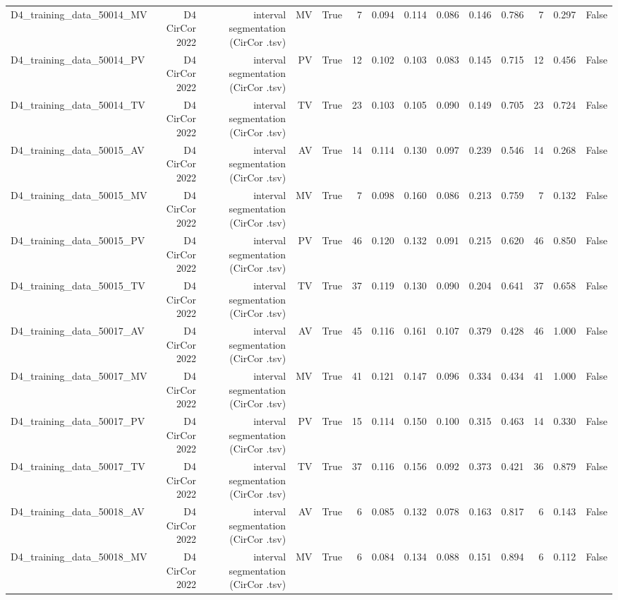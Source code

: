 \begin{table}[htbp]
\begin{tabular}{lrrrrrrrrrrrrr}
    D4\_training\_data\_50014\_MV & D4 CirCor 2022 & interval segmentation (CirCor .tsv) & MV & True & 7 & 0.094 & 0.114 & 0.086 & 0.146 & 0.786 & 7 & 0.297 & False \\
    D4\_training\_data\_50014\_PV & D4 CirCor 2022 & interval segmentation (CirCor .tsv) & PV & True & 12 & 0.102 & 0.103 & 0.083 & 0.145 & 0.715 & 12 & 0.456 & False \\
    D4\_training\_data\_50014\_TV & D4 CirCor 2022 & interval segmentation (CirCor .tsv) & TV & True & 23 & 0.103 & 0.105 & 0.090 & 0.149 & 0.705 & 23 & 0.724 & False \\
    D4\_training\_data\_50015\_AV & D4 CirCor 2022 & interval segmentation (CirCor .tsv) & AV & True & 14 & 0.114 & 0.130 & 0.097 & 0.239 & 0.546 & 14 & 0.268 & False \\
    D4\_training\_data\_50015\_MV & D4 CirCor 2022 & interval segmentation (CirCor .tsv) & MV & True & 7 & 0.098 & 0.160 & 0.086 & 0.213 & 0.759 & 7 & 0.132 & False \\
    D4\_training\_data\_50015\_PV & D4 CirCor 2022 & interval segmentation (CirCor .tsv) & PV & True & 46 & 0.120 & 0.132 & 0.091 & 0.215 & 0.620 & 46 & 0.850 & False \\
    D4\_training\_data\_50015\_TV & D4 CirCor 2022 & interval segmentation (CirCor .tsv) & TV & True & 37 & 0.119 & 0.130 & 0.090 & 0.204 & 0.641 & 37 & 0.658 & False \\
    D4\_training\_data\_50017\_AV & D4 CirCor 2022 & interval segmentation (CirCor .tsv) & AV & True & 45 & 0.116 & 0.161 & 0.107 & 0.379 & 0.428 & 46 & 1.000 & False \\
    D4\_training\_data\_50017\_MV & D4 CirCor 2022 & interval segmentation (CirCor .tsv) & MV & True & 41 & 0.121 & 0.147 & 0.096 & 0.334 & 0.434 & 41 & 1.000 & False \\
    D4\_training\_data\_50017\_PV & D4 CirCor 2022 & interval segmentation (CirCor .tsv) & PV & True & 15 & 0.114 & 0.150 & 0.100 & 0.315 & 0.463 & 14 & 0.330 & False \\
    D4\_training\_data\_50017\_TV & D4 CirCor 2022 & interval segmentation (CirCor .tsv) & TV & True & 37 & 0.116 & 0.156 & 0.092 & 0.373 & 0.421 & 36 & 0.879 & False \\
    D4\_training\_data\_50018\_AV & D4 CirCor 2022 & interval segmentation (CirCor .tsv) & AV & True & 6 & 0.085 & 0.132 & 0.078 & 0.163 & 0.817 & 6 & 0.143 & False \\
    D4\_training\_data\_50018\_MV & D4 CirCor 2022 & interval segmentation (CirCor .tsv) & MV & True & 6 & 0.084 & 0.134 & 0.088 & 0.151 & 0.894 & 6 & 0.112 & False \\

\end{tabular}
\end{table}
